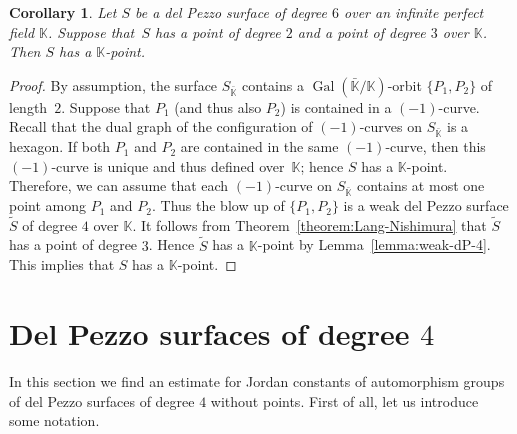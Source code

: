 \documentclass[12pt]{amsart}
\newcounter{cequation}[section]
\newtheorem{corollary}[cequation]{Corollary}
\theoremstyle{definition}
\theoremstyle{remark}
\newcommand{\KK}{\mathbb{K}}
\newcommand{\Gal}{\operatorname{Gal}}
\begin{document}
\begin{corollary}\label{corollary:dP6-deg-2-3}
Let $S$ be a del Pezzo surface of degree $6$ over an infinite perfect field $\KK$. Suppose that~$S$
has a point of degree $2$ and a point of degree $3$ over $\KK$. Then $S$ has a $\KK$-point.
\end{corollary}

\begin{proof}
By assumption, the surface $S_{\bar{\KK}}$ contains a $\Gal(\bar{\KK}/\KK)$-orbit
$\{P_1,P_2\}$ of length~$2$.
Suppose that $P_1$ (and thus also $P_2$) is contained in a $(-1)$-curve.
Recall that the dual graph of the configuration of $(-1)$-curves on $S_{\bar{\KK}}$
is a hexagon. If both $P_1$ and $P_2$ are contained in the same $(-1)$-curve, then this
$(-1)$-curve is unique and thus defined over~$\KK$; hence $S$ has a $\KK$-point.
Therefore, we can assume that each $(-1)$-curve on $S_{\bar{\KK}}$ contains at most one point among $P_1$ and $P_2$.
Thus the blow up of $\{P_1,P_2\}$ is a weak del Pezzo surface $\tilde{S}$ of degree $4$ over $\KK$.
It follows from Theorem~\ref{theorem:Lang-Nishimura} that $\tilde{S}$ has a point of degree $3$.
Hence $\tilde{S}$ has a $\KK$-point by Lemma~\ref{lemma:weak-dP-4}.
This implies that $S$ has a $\KK$-point.
\end{proof}













\section{Del Pezzo surfaces of degree $4$}
\label{section:dP4}

In this section we find an estimate for Jordan constants
of automorphism groups of del Pezzo surfaces of degree $4$
without points. First of all, let us introduce some notation.
\end{document}
